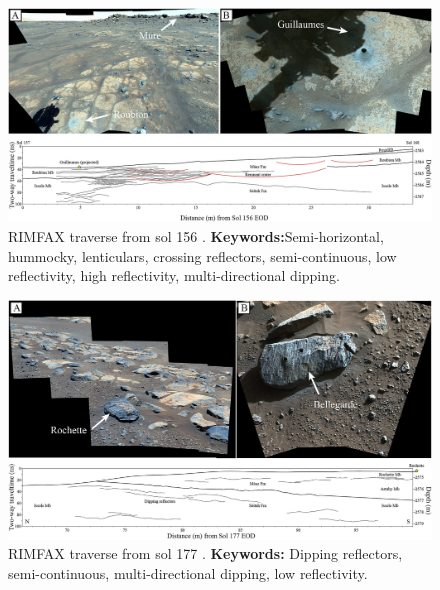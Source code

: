 \begin{figure}[h!]
    \centering
    \includegraphics[width=0.9\linewidth]{Figures/0.5RIMFAX/Simon_2023-fig-05.jpg}
    \caption[RIMFAX traverse from sol 156]{RIMFAX traverse from sol 156 \citep{Simon2023}. \textbf{Keywords:}Semi-horizontal, hummocky, lenticulars, crossing reflectors, semi-continuous, low reflectivity, high reflectivity, multi-directional dipping. }
    \label{fig:Simon23-5}
\end{figure}

\begin{figure}[h!]
    \centering
    \includegraphics[width=0.9\linewidth]{Figures/0.5RIMFAX/Simon_2023-fig-06.jpg}
    \caption[RIMFAX traverse from sol 177.]{RIMFAX traverse from sol 177 \citep{Simon2023}. \textbf{Keywords:} Dipping reflectors, semi-continuous, multi-directional dipping, low reflectivity.}
    \label{fig:Simon23-6}
\end{figure}

